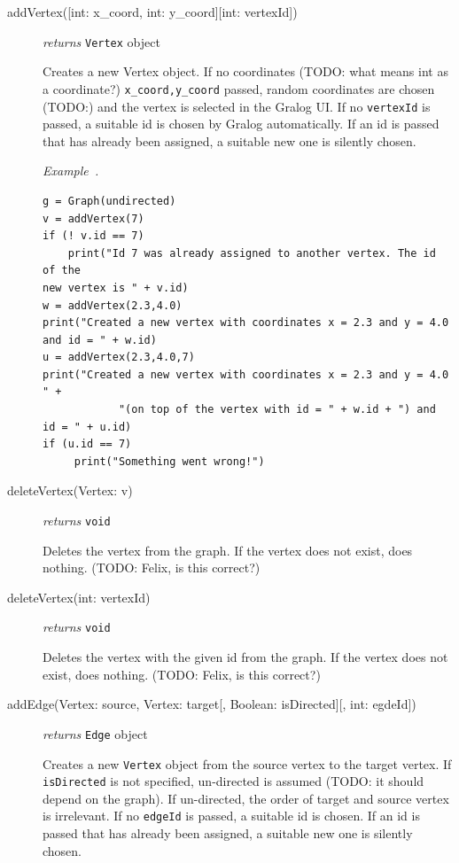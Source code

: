 \documentclass{article}
\newcounter{example}
\newenvironment{example}[1][]{\refstepcounter{example}\par\medskip
   \noindent \textit{Example~\theexample. #1} \rmfamily}{\medskip}
\begin{document}
\begin{description}
\item[addVertex({[int: x\_coord, int: y\_coord]}{[int: vertexId]})]\emph{returns}
  \texttt{Vertex} object

  Creates a new Vertex object. If no coordinates (TODO: what means int
  as a coordinate?) \texttt{x\_coord,y\_coord} passed,
  random coordinates are chosen (TODO:) and the vertex is selected in
  the Gralog UI. If no \texttt{vertexId} is passed, a suitable id is
  chosen by Gralog automatically. If an id is passed that has already
  been assigned, a suitable new one is silently chosen.

  \begin{example}
\begin{verbatim}
g = Graph(undirected)
v = addVertex(7)
if (! v.id == 7)
    print("Id 7 was already assigned to another vertex. The id of the
new vertex is " + v.id)
w = addVertex(2.3,4.0)
print("Created a new vertex with coordinates x = 2.3 and y = 4.0 and id = " + w.id)
u = addVertex(2.3,4.0,7)
print("Created a new vertex with coordinates x = 2.3 and y = 4.0 " +
            "(on top of the vertex with id = " + w.id + ") and id = " + u.id)
if (u.id == 7)
     print("Something went wrong!")
\end{verbatim}
  \end{example}


  
\item[deleteVertex(Vertex: v)] \emph{returns} \texttt{void}

Deletes the vertex from the graph. If the vertex does not exist, does
nothing. (TODO: Felix, is this correct?)

\item[deleteVertex(int: vertexId)] \emph{returns} \texttt{void}

Deletes the vertex with the given id from the graph. If the vertex does not exist, does
nothing. (TODO: Felix, is this correct?)

\item[addEdge(Vertex: source, Vertex: target{[, Boolean: isDirected][,
    int: egdeId]})] \emph{returns} \texttt{Edge} object


Creates a new \texttt{Vertex} object from the source vertex to the
target vertex. If \texttt{isDirected} is not specified, un-directed is
assumed (TODO: it should depend on the graph). If un-directed, the
order of target and source vertex is irrelevant. If no \texttt{edgeId}
is passed, a suitable id is chosen. If an id is passed that has
already been assigned, a suitable new one is silently chosen.


\end{description}
\end{document}
